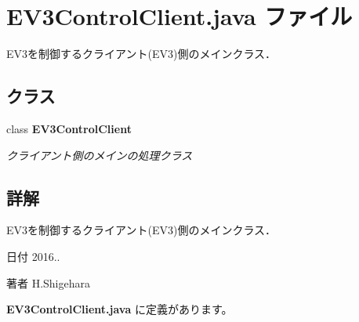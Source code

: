 \section{E\-V3\-Control\-Client.\-java ファイル}
\label{_e_v3_control_client_8java}


E\-V3を制御するクライアント(\-E\-V3)側のメインクラス．  


\subsection*{クラス}
\begin{DoxyCompactItemize}
\item 
class {\bf E\-V3\-Control\-Client}
\begin{DoxyCompactList}\small\item\em クライアント側のメインの処理クラス \end{DoxyCompactList}\end{DoxyCompactItemize}


\subsection{詳解}
E\-V3を制御するクライアント(\-E\-V3)側のメインクラス． \begin{DoxyDate}{日付}
2016.. 
\end{DoxyDate}
\begin{DoxyAuthor}{著者}
H.\-Shigehara 
\end{DoxyAuthor}


 {\bf E\-V3\-Control\-Client.\-java} に定義があります。

